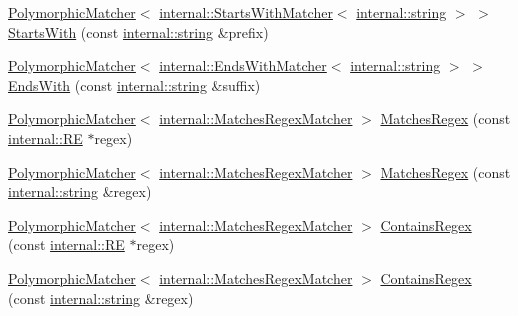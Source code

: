 \begin{DoxyCompactItemize}
\item 
\hyperlink{classtesting_1_1_polymorphic_matcher}{Polymorphic\+Matcher}$<$ \hyperlink{classtesting_1_1internal_1_1_starts_with_matcher}{internal\+::\+Starts\+With\+Matcher}$<$ \hyperlink{namespacetesting_1_1internal_a8e8ff5b11e64078831112677156cb111}{internal\+::string} $>$ $>$ \hyperlink{namespacetesting_ae0502232432b1fe8361d296c6de6beda}{Starts\+With} (const \hyperlink{namespacetesting_1_1internal_a8e8ff5b11e64078831112677156cb111}{internal\+::string} \&prefix)
\item 
\hyperlink{classtesting_1_1_polymorphic_matcher}{Polymorphic\+Matcher}$<$ \hyperlink{classtesting_1_1internal_1_1_ends_with_matcher}{internal\+::\+Ends\+With\+Matcher}$<$ \hyperlink{namespacetesting_1_1internal_a8e8ff5b11e64078831112677156cb111}{internal\+::string} $>$ $>$ \hyperlink{namespacetesting_aec11c4e418a835ca2c0c3cbdb29b28ba}{Ends\+With} (const \hyperlink{namespacetesting_1_1internal_a8e8ff5b11e64078831112677156cb111}{internal\+::string} \&suffix)
\item 
\hyperlink{classtesting_1_1_polymorphic_matcher}{Polymorphic\+Matcher}$<$ \hyperlink{classtesting_1_1internal_1_1_matches_regex_matcher}{internal\+::\+Matches\+Regex\+Matcher} $>$ \hyperlink{namespacetesting_a4dac232f315edc259b62ce88e413b107}{Matches\+Regex} (const \hyperlink{classtesting_1_1internal_1_1_r_e}{internal\+::\+RE} $\ast$regex)
\item 
\hyperlink{classtesting_1_1_polymorphic_matcher}{Polymorphic\+Matcher}$<$ \hyperlink{classtesting_1_1internal_1_1_matches_regex_matcher}{internal\+::\+Matches\+Regex\+Matcher} $>$ \hyperlink{namespacetesting_afea6e0eaf0ae69b409fc1c0285df6c8c}{Matches\+Regex} (const \hyperlink{namespacetesting_1_1internal_a8e8ff5b11e64078831112677156cb111}{internal\+::string} \&regex)
\item 
\hyperlink{classtesting_1_1_polymorphic_matcher}{Polymorphic\+Matcher}$<$ \hyperlink{classtesting_1_1internal_1_1_matches_regex_matcher}{internal\+::\+Matches\+Regex\+Matcher} $>$ \hyperlink{namespacetesting_a899838630a71376aa071dfd7c500f2ca}{Contains\+Regex} (const \hyperlink{classtesting_1_1internal_1_1_r_e}{internal\+::\+RE} $\ast$regex)
\item 
\hyperlink{classtesting_1_1_polymorphic_matcher}{Polymorphic\+Matcher}$<$ \hyperlink{classtesting_1_1internal_1_1_matches_regex_matcher}{internal\+::\+Matches\+Regex\+Matcher} $>$ \hyperlink{namespacetesting_ad8efafa15630a8274f41f5e22f8f0e49}{Contains\+Regex} (const \hyperlink{namespacetesting_1_1internal_a8e8ff5b11e64078831112677156cb111}{internal\+::string} \&regex)

\end{DoxyCompactItemize}
